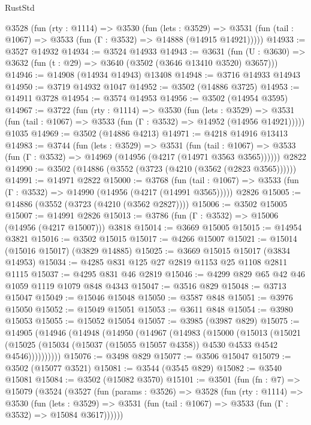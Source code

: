 \begin{lexlean}{RustStd}
\begin{coremodule}
  @3528
    (fun (rty : @1114) =>
    @3530
      (fun (lets : @3529) =>
      @3531 (fun (tail : @1067) => @3533 (fun (Γ : @3532) => @14888 (@14915 @14921)))))
@14933 := @3527 @14932
@14934 := @3524 @14933
@14943 := @3631
    (fun (U : @3630) => @3632 (fun (t : @29) => @3640 (@3502 (@3646 @13410 @3520) @3657)))
@14946 := @14908 (@14934 @14943) @13408
@14948 := @3716 @14933 @14943
@14950 := @3719 @14932 @1047
@14952 := @3502 (@14886 @3725)
@14953 := @14911 @3728
@14954 := @3574 @14953
@14956 := @3502 (@14954 @3595)
@14967 := @3722
    (fun (rty : @1114) =>
    @3530
      (fun (lets : @3529) =>
      @3531 (fun (tail : @1067) => @3533 (fun (Γ : @3532) => @14952 (@14956 @14921)))))
    @1035
@14969 := @3502 (@14886 @4213)
@14971 := @4218 @14916 @13413
@14983 := @3744
    (fun (lets : @3529) =>
    @3531
      (fun (tail : @1067) =>
      @3533 (fun (Γ : @3532) => @14969 (@14956 (@4217 (@14971 @3563 @3565))))))
    @2822
@14990 := @3502 (@14886 (@3552 (@3723 (@4210 (@3562 (@2823 @3565))))))
@14991 := @14971 @2822
@15000 := @3768
    (fun (tail : @1067) => @3533 (fun (Γ : @3532) => @14990 (@14956 (@4217 (@14991 @3565)))))
    @2826
@15005 := @14886 (@3552 (@3723 (@4210 (@3562 @2827))))
@15006 := @3502 @15005
@15007 := @14991 @2826
@15013 := @3786 (fun (Γ : @3532) => @15006 (@14956 (@4217 @15007))) @3818
@15014 := @3669 @15005
@15015 := @14954 @3821
@15016 := @3502 @15015
@15017 := @4266 @15007
@15021 := @15014 (@15016 @15017) (@3829 @14885)
@15025 := @3669 @15015 @15017 (@3834 @14953)
@15034 := @4285 @831 @125 @27 @2819 @1153 @25 @1108 @2811 @1115
@15037 := @4295 @831 @46 @2819
@15046 := @4299 @829 @65 @42 @46 @1059 @1119 @1079 @848 @4343
@15047 := @3516 @829
@15048 := @3713 @15047
@15049 := @15046 @15048
@15050 := @3587 @848
@15051 := @3976 @15050
@15052 := @15049 @15051
@15053 := @3611 @848
@15054 := @3980 @15053
@15055 := @15052 @15054
@15057 := @3985 (@3987 @829)
@15075 := @14905
    (@14946
      (@14948
        (@14950
          (@14967
            (@14983
              (@15000
                (@15013
                  (@15021
                    (@15025 (@15034 (@15037 (@15055 @15057 @4358)) @4530 @4533 @4542 @4546))))))))))
@15076 := @3498 @829
@15077 := @3506 @15047
@15079 := @3502 (@15077 @3521)
@15081 := @3544 (@3545 @829)
@15082 := @3540 @15081
@15084 := @3502 (@15082 @3570)
@15101 := @3501
    (fun (fn : @7) =>
    @15079
      (@3524
        (@3527
          (fun (params : @3526) =>
          @3528
            (fun (rty : @1114) =>
            @3530
              (fun (lets : @3529) =>
              @3531 (fun (tail : @1067) => @3533 (fun (Γ : @3532) => @15084 @3617))))))

\end{coremodule}
\end{lexlean}
